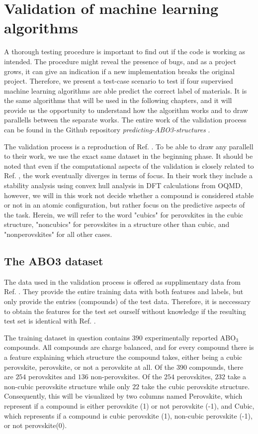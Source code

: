 \chapter{Validation of machine learning algorithms}
\label{chap:validation}

A thorough testing procedure is important to find out if the code is working as intended. The procedure might reveal the presence of bugs, and as a project grows, it can give an indication if a new implementation breaks the original project. Therefore, we present a test-case scenario to test if four supervised machine learning algorithms are able predict the correct label of materials. It is the same algorithms that will be used in the following chapters, and it will provide us the opportunity to understand how the algorithm works and to draw parallells between the separate works. The entire work of the validation process can be found in the Github repository \textit{predicting-ABO3-structures} \cite{Ohebbi2021a}.

The validation process is a reproduction of Ref. \cite{Balachandran2018}. To be able to draw any parallell to their work, we use the exact same dataset in the beginning phase. It should be noted that even if the computational aspects of the validation is closely related to Ref. \cite{Balachandran2018}, the work eventually diverges in terms of focus. In their work they include a stability analysis using convex hull analysis in DFT calculations from OQMD, however, we will in this work not decide whether a compound is considered stable or not in an atomic configuration, but rather focus on the predictive aspects of the task. Herein, we will refer to the word "cubics" for perovskites in the cubic structure, "noncubics" for perovskites in a structure other than cubic, and "nonperovskites" for all other cases.

\section{The ABO3 dataset}

The data used in the validation process is offered as supplimentary data from Ref. \cite{Balachandran2018}. They provide the entire training data with both features and labels, but only provide the entries (compounds) of the test data. Therefore, it is neccessary to obtain the features for the test set ourself without knowledge if the resulting test set is identical with Ref. \cite{Balachandran2018}.

The training dataset in question contains $390$ experimentally reported ABO$_3$ compounds. All compounds are charge balanced, and for every compound there is a feature explaining which structure the compound takes, either being a cubic perovskite, perovskite, or not a perovskite at all. Of the $390$ compounds, there are $254$ perovskites and $136$ non-perovskites. Of the $254$ perovskites, $232$ take a non-cubic perovskite structure while only $22$ take the cubic perovskite structure. Consequently, this will be visualized by two columns named Perovskite, which represent if a compound is either perovskite (1) or not perovskite (-1), and Cubic, which represents if a compound is cubic perovskite (1), non-cubic perovskite (-1), or not perovskite(0).


